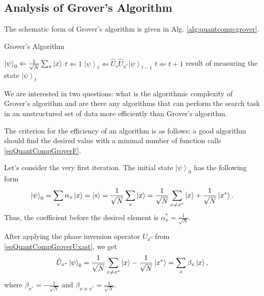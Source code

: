 \subsection{Analysis of Grover's Algorithm}

The schematic form of Grover's algorithm is given in Alg.
\ref{alg:quantcomp:grover}.  
\begin{algorithm}
\caption{Grover's Algorithm}
\label{alg:quantcomp:grover}
\begin{algorithmic}
    \STATE $\left|\psi\right>_0 \Leftarrow \frac{1}{\sqrt{N}}\sum_x 
    \ket{x}$
    \STATE $t \Leftarrow 1$
    \REPEAT
    \STATE $\left|\psi\right>_t \Leftarrow \hat{U}_s\hat{U}_{x^{\ast}}
    \left|\psi\right>_{t-1}$
    \STATE $t \Leftarrow t + 1$
    \RETURN result of measuring the state $\left|\psi\right>_t$
\end{algorithmic}
\end{algorithm}

We are interested in two questions: what is the algorithmic complexity
of Grover's algorithm and are there any algorithms that can perform
the search task in an unstructured set of data more efficiently than
Grover's algorithm.

The criterion for the efficiency of an algorithm is as follows: a good
algorithm should find the desired value with a minimal number of function
calls \eqref{eqQuantCompGroverF}.

Let's consider the very first iteration. The initial state
$\left|\psi\right>_0$ has the following form
\begin{equation}
\left|\psi\right>_0 =
\sum_x \alpha_x \ket{x} =  
\ket{s} = 
\frac{1}{\sqrt{N}}\sum_x \ket{x} = 
\frac{1}{\sqrt{N}}\sum_{x\ne x^{\ast}} \ket{x} +
\frac{1}{\sqrt{N}} \left|x^{\ast}\right>.
\nonumber
\end{equation}
Thus, the coefficient before the desired element is
$\alpha_x^{\ast} = \frac{1}{\sqrt{N}}$. 

After applying the phase inversion operator
$U_{x^{\ast}}$ from \eqref{eqQuantCompGroverUxast}, we get
\begin{equation}
\hat{U}_{x^{\ast}} \left|\psi\right>_0 =
\frac{1}{\sqrt{N}}\sum_{x\ne x^{\ast}} \ket{x} - 
\frac{1}{\sqrt{N}} \left|x^{\ast}\right> = \sum_x \beta_x \ket{x},
\nonumber
\end{equation}
where $\beta_{x^\ast} = - \frac{1}{\sqrt{N}}$ and $\beta_{x \ne x^\ast} =
\frac{1}{\sqrt{N}}$. 

